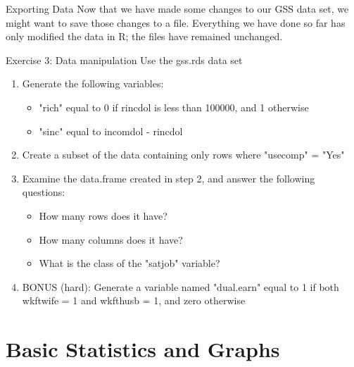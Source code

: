 \documentclass[table,smaller]{beamer}
\begin{document}
\begin{frame}[label=sec-5-6]{Exporting Data}
Now that we have made some changes to our GSS data set, we might want to save those changes to a file. Everything we have done so far has only modified the data in R; the files have remained unchanged. 
\end{frame}

\begin{frame}[label=sec-5-7]{Exercise 3: Data manipulation}
Use the gss.rds data set

\begin{enumerate}
\item Generate the following variables:
\begin{itemize}
\item "rich" equal to 0 if rincdol is less than 100000, and 1 otherwise
\item "sinc" equal to incomdol - rincdol
\end{itemize}
\item Create a subset of the data containing only rows where "usecomp" = "Yes"
\item Examine the data.frame created in step 2, and answer the following questions:
\begin{itemize}
\item How many rows does it have?
\item How many columns does it have?
\item What is the class of the "satjob" variable?
\end{itemize}
\item BONUS (hard): Generate a variable named "dual.earn" equal to 1 if both wkftwife = 1 and wkfthusb = 1, and zero otherwise
\end{enumerate}
\end{frame}

\section{Basic Statistics and Graphs}
\label{sec-6}
\end{document}
